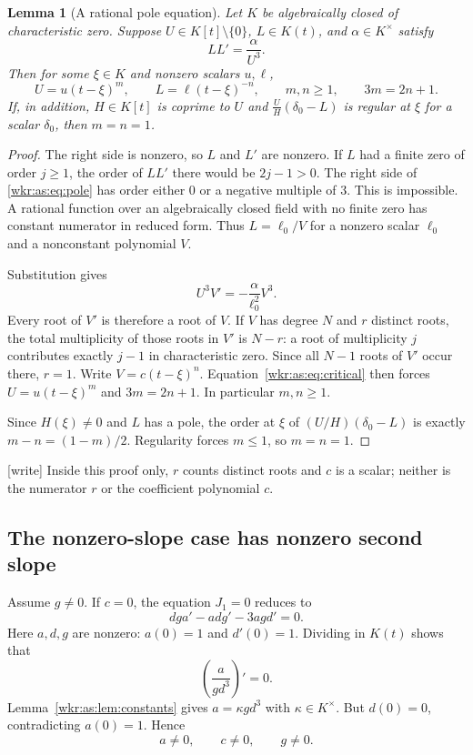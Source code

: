 \documentclass[11pt,a4paper]{article}
\numberwithin{equation}{section}
\newtheorem{lemma}[theorem]{Lemma}
\theoremstyle{definition}
\theoremstyle{remark}
\begin{document}
\begin{lemma}[A rational pole equation]\label{wkr:as:lem:pole}
Let $K$ be algebraically closed of characteristic zero. Suppose
$U\in K[t]\setminus\{0\}$, $L\in K(t)$, and
$\alpha\in K^\times$ satisfy
\begin{equation}\label{wkr:as:eq:pole}
LL'=\frac{\alpha}{U^3}.
\end{equation}
Then for some $\xi\in K$ and nonzero scalars $u,\ell$,
\[
U=u(t-\xi)^m,\qquad L=\ell(t-\xi)^{-n},
\qquad m,n\ge1,\qquad 3m=2n+1.
\]
If, in addition, $H\in K[t]$ is coprime to $U$ and
$\frac UH(\delta_0-L)$ is regular at $\xi$ for a scalar $\delta_0$,
then $m=n=1$.
\end{lemma}
\begin{proof}
The right side is nonzero, so $L$ and $L'$ are nonzero. If $L$ had a
finite zero of order $j\ge1$, the order of $LL'$ there would be $2j-1>0$.
The right side of \eqref{wkr:as:eq:pole} has order either $0$ or a
negative multiple of $3$. This is impossible. A rational function over an
algebraically closed field with no finite zero has constant numerator in
reduced form. Thus $L=\ell_0/V$ for a nonzero scalar $\ell_0$ and a
nonconstant polynomial $V$.

Substitution gives
\begin{equation}\label{wkr:as:eq:critical}
U^3V'=-\frac{\alpha}{\ell_0^2}V^3.
\end{equation}
Every root of $V'$ is therefore a root of $V$. If $V$ has degree $N$ and
$r$ distinct roots, the total multiplicity of those roots in $V'$ is
$N-r$: a root of multiplicity $j$ contributes exactly $j-1$ in
characteristic zero. Since all $N-1$ roots of $V'$ occur there, $r=1$.
Write $V=c(t-\xi)^n$. Equation~\eqref{wkr:as:eq:critical} then forces
$U=u(t-\xi)^m$ and $3m=2n+1$. In particular $m,n\ge1$.

Since $H(\xi)\ne0$ and $L$ has a pole, the order at $\xi$ of
$(U/H)(\delta_0-L)$ is exactly $m-n=(1-m)/2$. Regularity forces $m\le1$,
so $m=n=1$.
\end{proof}
\noindent\textup{[write]} Inside this proof only, $r$ counts distinct
roots and $c$ is a scalar; neither is the numerator $r$ or the
coefficient polynomial $c$.

\subsection{The nonzero-slope case has nonzero second slope}

Assume $g\ne0$. If $c=0$, the equation $J_1=0$ reduces to
\[
dga'-adg'-3agd'=0.
\]
Here $a,d,g$ are nonzero: $a(0)=1$ and $d'(0)=1$. Dividing in $K(t)$
shows that
\[
\left(\frac{a}{gd^3}\right)'=0.
\]
Lemma~\ref{wkr:as:lem:constants} gives $a=\kappa gd^3$ with
$\kappa\in K^\times$. But $d(0)=0$, contradicting $a(0)=1$.
Hence
\begin{equation}\label{wkr:as:eq:nonzeroacg}
a\ne0,\qquad c\ne0,\qquad g\ne0.
\end{equation}
\end{document}
